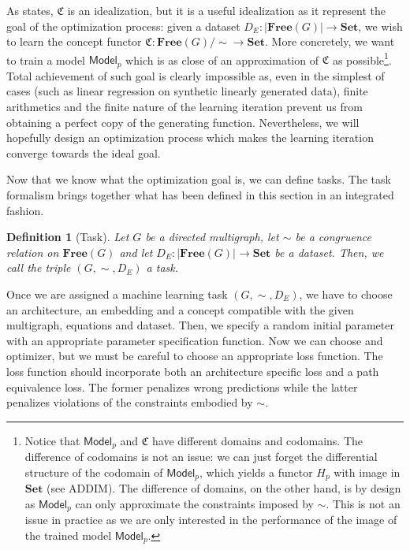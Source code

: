 \documentclass[11pt,a4paper,openright,twoside]{report}
\newcounter{mycounter}
\theoremstyle{plain}
\newtheorem{definition}[mycounter]{Definition}
\theoremstyle{definition}
\begin{document}
As \cite{gavranovic2019compositional} states, $\mathfrak{C}$ is an idealization, but it is a useful idealization as it represent the goal of the optimization process: given a dataset $D_E: |\mathbf{Free}(G)| \to \mathbf{Set}$, we wish to learn the concept functor $\mathfrak{C}: \mathbf{Free}(G)/{\sim} \to \mathbf{Set}$. More concretely, we want to train a model $\mathsf{Model}_p$ which is as close of an approximation of $\mathfrak{C}$ as possible\footnote{Notice that $\mathsf{Model}_p$ and $\mathfrak{C}$ have different domains and codomains. The difference of codomains is not an issue: we can just forget the differential structure of the codomain of $\mathsf{Model}_p$, which yields a functor $H_p$ with image in $\mathbf{Set}$ (see ADDIM). The difference of domains, on the other hand, is by design as $\mathsf{Model}_p$ can only approximate the constraints imposed by $\sim$. This is not an issue in practice as we are only interested in the performance of the image of the trained model $\mathsf{Model}_p$.}. Total achievement of such goal is clearly impossible as, even in the simplest of cases (such as linear regression on synthetic linearly generated data), finite arithmetics and the finite nature of the learning iteration prevent us from obtaining a perfect copy of the generating function.
Nevertheless, we will hopefully design an optimization process which makes the learning iteration converge towards the ideal goal.

Now that we know what the optimization goal is, we can define tasks. The task formalism brings together what has been defined in this section in an integrated fashion.

\begin{definition}[Task]
  Let $G$ be a directed multigraph, let ${\sim}$ be a congruence relation on $\mathbf{Free}(G)$ and let $D_E: |\mathbf{Free}(G)| \to \mathbf{Set}$ be a dataset. Then, we call the triple $(G,{\sim},D_E)$ a task.
\end{definition}

Once we are assigned a machine learning task $(G,{\sim},D_E)$, we have to choose an architecture, an embedding and a concept compatible with the given multigraph, equations and dataset. Then, we specify a random initial parameter with an appropriate parameter specification function. Now we can choose and optimizer, but we must be careful to choose an appropriate loss function. The loss function should incorporate both an architecture specific loss and a path equivalence loss. The former penalizes wrong predictions while the latter penalizes violations of the constraints embodied by ${\sim}$.
\end{document}
